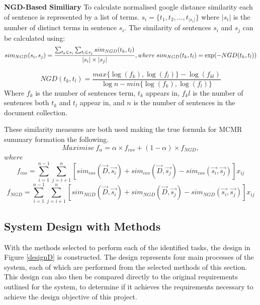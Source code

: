 \textbf{NGD-Based Similiary}
To calculate normalised google distance similarity each of sentence is represented by a list of terms. $s_i=\{t_1,t_2, \dots, t_{|s_i|}\}$ where $|s_i|$ is the number of distinct terms in sentence $s_i$. The similarity of sentences $s_i$ and $s_j$ can be calculated using:
\begin{equation}
    sim_{NGD}(s_i, s_j) = \frac{\sum_{t_k \in s_i} \sum_{t_l \in s_j} sim_{NGD}(t_k,t_l)}{|s_i| \times |s_j|}, \\ where \; sim_{NGD}(t_k,t_l) = \exp(-NGD(t_k, t_l))
    \label{ngdSent}
\end{equation}

\begin{equation}
    NGD(t_k,t_l) = \frac{max\{\log(f_k), \log(f_l)\}-\log(f_{kl})}{\log n - min \{\log(f_k),\log(f_l)\}}
    \label{ngdTerm}
\end{equation}
Where $f_k$ is the number of sentences term, $t_k$ appears in, $f_kl$ is the number of sentences both $t_k$ and $t_l$ appear in, and $n$ is the number of sentences in the document collection.

These similarity measures are both used making the true formula for MCMR summary formation the following.
\begin{equation}
    Maximise \: f_{\alpha} = \alpha \times f_{cos} + (1-\alpha) \times f_{NGD},
    \label{mcmrFull}
\end{equation}
$where$
\begin{equation}
    f_{cos} = \sum_{i=1}^{n-1} \sum_{j=i+1}^n [sim_{cos}(\vec{D}, \vec{s_i}) + sim_{cos}(\vec{D}, \vec{s_j}) - sim_{cos}(\vec{s_i}, \vec{s_j})]x_{ij}
\end{equation}
\begin{equation}
    f_{NGD} = \sum_{i=1}^{n-1} \sum_{j=i+1}^n [sim_{NGD}(\vec{D}, \vec{s_i}) + sim_{NGD}(\vec{D}, \vec{s_j}) - sim_{NGD}(\vec{s_i}, \vec{s_j})]x_{ij}
\end{equation}

\subsection{System Design with Methods}
With the methods selected to perform each of the identified tasks, the design in Figure \ref{designD} is constructed. The design represents four main processes of the system, each of which are  performed from the selected methods of this section. This design can also then be compared directly to the original requirements outlined for the system, to determine if it achieves the requirements necessary to achieve the design objective of this project.

